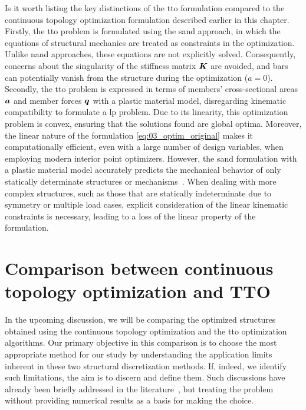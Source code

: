 Is it worth listing the key distinctions of the \gls{tto} formulation compared to the continuous topology optimization formulation described earlier in this chapter. Firstly, the \gls{tto} problem is formulated using the \gls{sand} approach, in which the equations of structural mechanics are treated as constraints in the optimization. Unlike \gls{nand} approaches, these equations are not explicitly solved. Consequently, concerns about the singularity of the stiffness matrix $\bm{K}$ are avoided, and bars can potentially vanish from the structure during the optimization ($a=0$). Secondly, the \gls{tto} problem is expressed in terms of members' cross-sectional areas $\bm{a}$ and member forces $\bm{q}$ with a plastic material model, disregarding kinematic compatibility to formulate a \gls{lp} problem. Due to its linearity, this optimization problem is convex, ensuring that the solutions found are global optima. Moreover, the linear nature of the formulation \ref{eq:03_optim_original} makes it computationally efficient, even with a large number of design variables, when employing modern interior point optimizers. However, the \gls{sand} formulation with a plastic material model accurately predicts the mechanical behavior of only statically determinate structures or mechanisms~. When dealing with more complex structures, such as those that are statically indeterminate due to symmetry or multiple load cases, explicit consideration of the linear kinematic constraints is necessary, leading to a loss of the linear property of the formulation.

\section{Comparison between continuous topology optimization and TTO} \label{sec:03_comparison}
In the upcoming discussion, we will be comparing the optimized structures obtained using the continuous topology optimization and the \gls{tto} optimization algorithms. Our primary objective in this comparison is to choose the most appropriate method for our study by understanding the application limits inherent in these two structural discretization methods. If, indeed, we identify such limitations, the aim is to discern and define them. Such discussions have already been briefly addressed in the literature~, but treating the problem without providing numerical results as a basis for making the choice.

